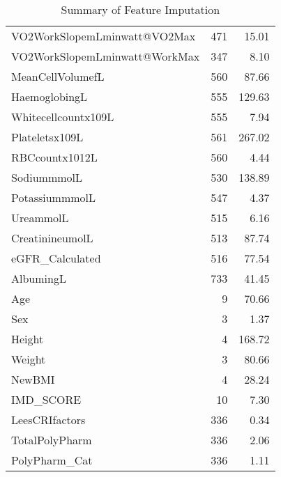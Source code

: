 \documentclass{article}
\begin{document}
\begin{table}[H]
\begin{tabular}{lrr}
        VO2WorkSlopemLminwatt@VO2Max  & 471                     & 15.01                    \\
        VO2WorkSlopemLminwatt@WorkMax & 347                     & 8.10                     \\
        MeanCellVolumefL              & 560                     & 87.66                    \\
        HaemoglobingL                 & 555                     & 129.63                   \\
        Whitecellcountx109L           & 555                     & 7.94                     \\
        Plateletsx109L                & 561                     & 267.02                   \\
        RBCcountx1012L                & 560                     & 4.44                     \\
        SodiummmolL                   & 530                     & 138.89                   \\
        PotassiummmolL                & 547                     & 4.37                     \\
        UreammolL                     & 515                     & 6.16                     \\
        CreatinineumolL               & 513                     & 87.74                    \\
        eGFR\_Calculated              & 516                     & 77.54                    \\
        AlbumingL                     & 733                     & 41.45                    \\
        Age                           & 9                       & 70.66                    \\
        Sex                           & 3                       & 1.37                     \\
        Height                        & 4                       & 168.72                   \\
        Weight                        & 3                       & 80.66                    \\
        NewBMI                        & 4                       & 28.24                    \\
        IMD\_SCORE                    & 10                      & 7.30                     \\
        LeesCRIfactors                & 336                     & 0.34                     \\
        TotalPolyPharm                & 336                     & 2.06                     \\
        PolyPharm\_Cat                & 336                     & 1.11                     \\
        \bottomrule
    \end{tabular}
    \caption{Summary of Feature Imputation}
    \label{tab:imputation-summary}
\end{table}
\end{document}
